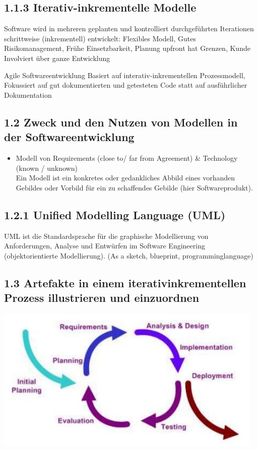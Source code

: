 \documentclass[10pt]{article}
\begin{document}
\subsection*{1.1.3 Iterativ-inkrementelle Modelle}
Software wird in mehreren geplanten und kontrolliert durchgeführten Iterationen schrittweise (inkrementell) entwickelt: Flexibles Modell, Gutes Risikomanagement, Frühe Einsetzbarkeit, Planung upfront hat Grenzen, Kunde Involviert über ganze Entwicklung

Agile Softwareentwicklung Basiert auf interativ-inkrementellen Prozessmodell, Fokussiert auf gut dokumentierten und getesteten Code statt auf ausführlicher Dokumentation

\subsection*{1.2 Zweck und den Nutzen von Modellen in der Softwareentwicklung}
\begin{itemize}
  \item Modell von Requirements (close to/ far from Agreement) \& Technology (known / unknown)\\
Ein Modell ist ein konkretes oder gedankliches Abbild eines vorhanden Gebildes oder Vorbild für ein zu schaffendes Gebilde (hier Softwareprodukt).
\end{itemize}

\subsection*{1.2.1 Unified Modelling Language (UML)}
UML ist die Standardsprache für die graphische Modellierung von Anforderungen, Analyse und Entwürfen im Software Engineering (objektorientierte Modellierung). (As a sketch, blueprint, programminglanguage)

\subsection*{1.3 Artefakte in einem iterativinkrementellen Prozess illustrieren und einzuordnen}
\begin{center}
\includegraphics[width=\linewidth]{images/2024_12_29_0d1d7b5551ea1b4b41bdg-02(1)}
\end{center}
\end{document}

